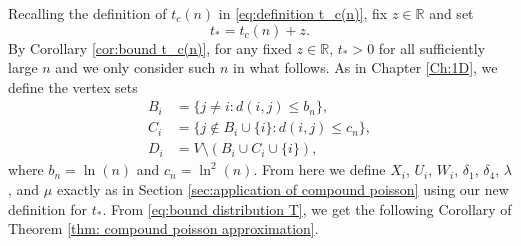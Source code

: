 Recalling the definition of $t_c(n)$ in \eqref{eq:definition t_c(n)}, fix $z \in \mathbb{R}$ and set
\begin{equation}
	t_* = t_c(n) + z.
\end{equation}
By Corollary \ref{cor:bound t_c(n)}, for any fixed $z \in \mathbb{R}$, $t_* > 0$ for all sufficiently large $n$ and we only consider such $n$ in what follows. As in Chapter \ref{Ch:1D}, we define the vertex sets
\begin{align}
	B_i &= \{j\neq i : d(i,j) \leq b_n \},\\
	C_i &= \{j\notin B_i\cup \{i\}: d(i,j) \leq c_n \},\\
	D_i &= V \setminus (B_i \cup C_i \cup \{i\}),
\end{align}
where $b_n = \ln(n)$ and $c_n = \ln^2(n)$.
From here we define $X_i$, $U_i$, $W_i$, $\delta_1$, $\delta_4$, $\lambda$, and $\mu$ exactly as in Section \ref{sec:application of compound poisson} using our new definition for $t_*$. From \eqref{eq:bound distribution T}, we get the following Corollary of Theorem \ref{thm: compound poisson approximation}.





